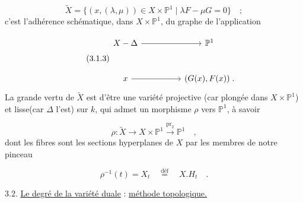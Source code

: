\begin{equation}\tag{3.1.2}
\widetilde{X} = \{(x,(\lambda,\mu)) \in X \times \mathbb{P}^1 \mid \lambda F - \mu G = 0\} \quad ;
\end{equation}
c'est l'adhérence schématique, dans $X \times \mathbb{P}^1$, du graphe de l'application

\begin{equation}\tag{3.1.3}
\begin{tikzcd}[row sep=large, column sep=huge]
X - \Delta \arrow[r] & \mathbb{P}^1 \\
x \arrow[r] & (G(x),F(x))\;.
\end{tikzcd}
\end{equation}
La grande vertu de $\widetilde{X}$ est d'être une variété projective (car plongée dans $X \times \mathbb{P}^1$) et lisse(car $\Delta$ l'est) sur $k$, qui admet un morphisme $\rho$ vers $\mathbb{P}^1$, à savoir

\begin{equation}\tag{3.1.4}
\rho : \widetilde{X} \longrightarrow X \times \mathbb{P}^1 \stackrel{\mathrm{pr}_2}{\longrightarrow} \mathbb{P}^1 \quad ,
\end{equation}
dont les fibres sont les sections hyperplanes de $X$ par les membres de notre pinceau

\begin{equation*}
\rho^{-1}(t) = X_t \quad \stackrel{\text{déf}}{=} \quad X.H_t \quad .
\end{equation*}



3.2. \underline{Le degré de la variété duale} : \underline{méthode topologique.}

